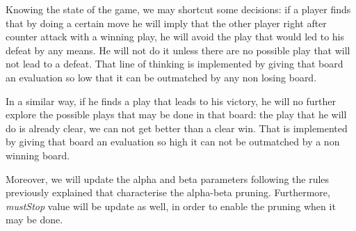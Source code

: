 \vspace{10pt}

Knowing the state of the game, we may shortcut some decisions: if a player
finds that by doing a certain move he will imply that the other player right
after counter attack with a winning play, he will avoid the play that would led
to his defeat by any means. He will not do it unless there are no possible play
that will not lead to a defeat. That line of thinking is implemented by giving
that board an evaluation so low that it can be outmatched by any non losing
board.

\vspace{10pt}

In a similar way, if he finds a play that leads to his victory, he will no
further explore the possible plays that may be done in that board: the play
that he will do is already clear, we can not get better than a clear win. That
is implemented by giving that board an evaluation so high it can not be
outmatched by a non winning board.

\vspace{10pt}

Moreover, we will update the alpha and beta parameters following the rules
previously explained that characterise the alpha-beta pruning. Furthermore,
\textit{mustStop} value will be update as well, in order to enable the pruning
when it may be done.

\vspace{10pt}

